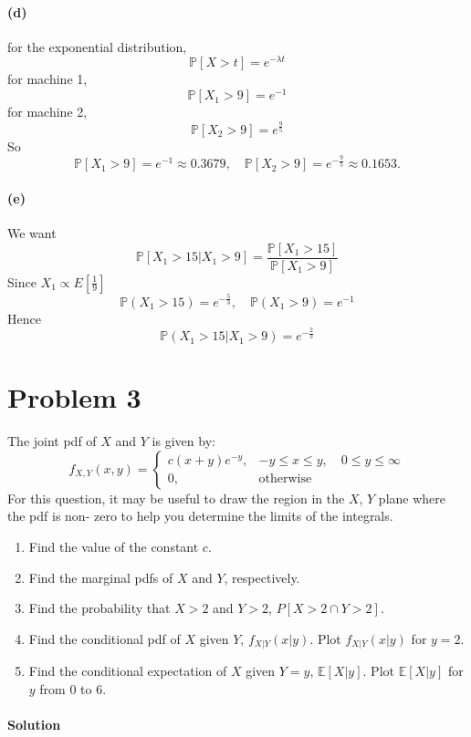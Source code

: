 \documentclass[a4paper,10pt]{article}
\newcommand{\Exp}[1]{E\left[#1\right]}  %
\begin{document}
\paragraph{(d)}
for the exponential distribution,
\[
\mathbb{P}[X > t] = e^{-\lambda t}
\]
for machine 1, 
\[
\mathbb{P}[X_1 > 9] = e^{-1}
\]
for machine 2,
\[
\mathbb{P}[X_2 > 9] = e^{\frac{9}{5}}
\]
So 
\[
\boxed{
\mathbb{P}[X_1 > 9] = e^{-1} \approx 0.3679, \quad
\mathbb{P}[X_2 > 9] = e^{-\frac{9}{5}} \approx 0.1653.
}
\]

\paragraph{(e)}
We want
\[
\mathbb{P}[X_1 > 15 | X_1 > 9] = \frac{\mathbb{P}[X_1 > 15]}{\mathbb{P}[X_1 > 9]}
\]
Since \(X_1 \propto \Exp{\frac{1}{9}}\)
\[
\mathbb{P}(X_1 > 15) = e^{-\frac{5}{3}}, \quad \mathbb{P}(X_1 > 9) = e^{-1}
\]
Hence 
\[
\boxed{\mathbb{P}(X_1 > 15 | X_1 > 9) = e^{-\frac{2}{3}}}
\]

\section{Problem 3}\label{pro:3}
The joint pdf of \(X\) and \(Y\) is given by:
\[
f_{X,Y}(x, y) = 
\begin{cases}
c(x + y)e^{-y}, & -y \leq x \leq y, \quad 0 \leq y \leq \infty \\
0, & \text{otherwise}
\end{cases}
\]
For this question, it may be useful to draw the region in the $X$, $Y$ plane where the pdf is non-
zero to help you determine the limits of the integrals.
\begin{enumerate}[label=(\alph*)]
    \item Find the value of the constant $c$.
    \item Find the marginal pdfs of $X$ and $Y$, respectively.
    \item Find the probability that $X > 2$ and $Y > 2$, $P[X > 2 \cap Y > 2]$.
    \item Find the conditional pdf of $X$ given $Y$, $f_{X|Y}(x|y)$. Plot $f_{X|Y}(x|y)$ for $y = 2$.
    \item Find the conditional expectation of $X$ given $Y = y$, $\mathbb{E}[X|y]$. Plot $\mathbb{E}[X|y]$ for $y$ from 0 to 6.
\end{enumerate}

\paragraph{Solution}
\end{document}
